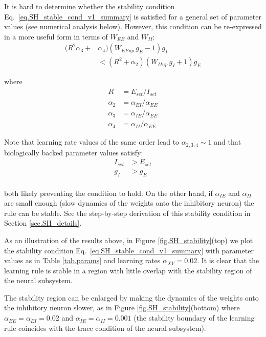 \documentclass[twocolumn]{article}
\newcommand{\EE}{\mathit{EE}}
\newcommand{\EI}{\mathit{EI}}
\newcommand{\IE}{\mathit{IE}}
\newcommand{\II}{\mathit{II}}
\newcommand{\XY}{\mathit{XY}}
\newcommand{\set}{\mathit{set}}
\newcommand{\up}{\mathit{up}}
\begin{document}
It is hard to determine whether the stability condition Eq.\ \ref{eq.SH_stable_cond_v1_summary} is satisfied for a general set of parameter values (see numerical analysis below). However, this condition can be re-expressed in a more useful form in terms of $W_{\EE}$ and $W_{\II}$:
\begin{equation}
\begin{aligned}
(R^2 \alpha_3 + & \alpha_4)(W_{\EE\up} \, g_E  - 1)g_I \\
& < (R^2 + \alpha_2)(W_{\II\up} \, g_I + 1)g_E
\end{aligned}
\label{eq.SH_stable_cond_v2_summary}
\end{equation}

\noindent where
\begin{displaymath}
\begin{aligned}
R & = E_{\set}/I_{\set} \\
\alpha_2 & = \alpha_{\EI}/\alpha_{\EE} \\
\alpha_3 & = \alpha_{\IE}/\alpha_{\EE} \\
\alpha_4 & = \alpha_{\II}/\alpha_{\EE}
\end{aligned}
\end{displaymath}

\noindent Note that learning rate values of the same order lead to $\alpha_{2,3,4} \sim 1$ and that biologically backed parameter values satisfy: 
\begin{displaymath}
\begin{aligned}
I_{\set} & > E_{\set} \\
g_I & > g_E \\
\end{aligned}
\end{displaymath}

\noindent both likely preventing the condition to hold. On the other hand, if $\alpha_{\IE}$ and $\alpha_{\II}$ are small enough (slow dynamics of the weights onto the inhibitory neuron) the rule can be stable. See the step-by-step derivation of this stability condition in Section \ref{sec.SH_details}.

As an illustration of the results above, in Figure \ref{fig.SH_stability}(top) we plot the stability condition Eq.\ \ref{eq.SH_stable_cond_v1_summary} with parameter values as in Table \ref{tab.params} and learning rates $\alpha_{\XY} = 0.02$. It is clear that the learning rule is stable in a region with little overlap with the stability region of the neural subsystem.

The stability region can be enlarged by making the dynamics of the weights onto the inhibitory neuron slower, as in Figure \ref{fig.SH_stability}(bottom) where $\alpha_{\EE}=\alpha_{\EI}=0.02$ and $\alpha_{\IE}=\alpha_{\II}=0.001$ (the stability boundary of the learning rule coincides with the trace condition of the neural subsystem).
\end{document}

